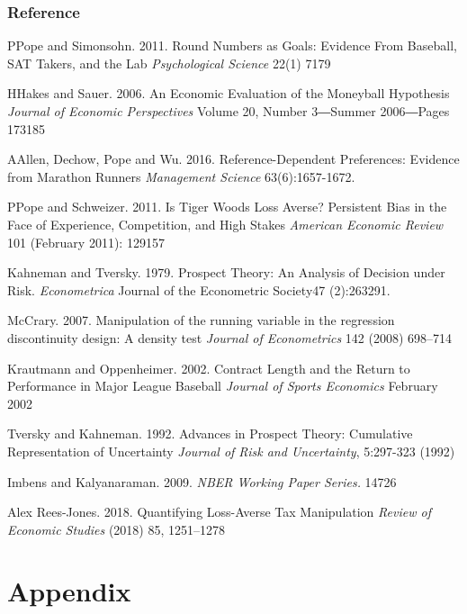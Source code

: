 \documentclass[dvipdfmx,12pt]{beamer}
\begin{document}
\begin{frame}\frametitle{Reference}
  \tiny
  \begin{thebibliography}{99}
    \bibitem PPope and Simonsohn. 2011.
    Round Numbers as Goals: Evidence From Baseball, SAT Takers, and the Lab
    \textit{Psychological Science} 22(1) 7179

    \bibitem HHakes and Sauer. 2006.
    An Economic Evaluation of the Moneyball Hypothesis
    \textit{Journal of Economic Perspectives} Volume 20, Number 3―Summer 2006―Pages 173185

    \bibitem AAllen, Dechow, Pope and Wu. 2016.
    Reference-Dependent Preferences: Evidence from Marathon Runners \textit{Management Science} 63(6):1657-1672.

    \bibitem PPope and Schweizer. 2011.
    Is Tiger Woods Loss Averse? Persistent Bias in the Face of Experience, Competition, and High Stakes
    \textit{American Economic Review} 101 (February 2011): 129157

    \bibitem{}Kahneman and Tversky. 1979.
    Prospect Theory: An Analysis of Decision under Risk.
    \textit{Econometrica}
    Journal of the Econometric Society47 (2):263291.

    \bibitem{}McCrary. 2007.
    Manipulation of the running variable in the regression discontinuity design: A density test
    \textit{Journal of Econometrics} 142 (2008) 698–714

    \bibitem{}Krautmann and Oppenheimer. 2002.
    Contract Length and the Return to Performance in Major League Baseball
    \textit{Journal of Sports Economics} February 2002

    \bibitem{}Tversky and Kahneman. 1992.
    Advances in Prospect Theory: Cumulative Representation of Uncertainty
    \textit{Journal of Risk and Uncertainty}, 5:297-323 (1992)

    \bibitem{}Imbens and Kalyanaraman. 2009.
    \textit{NBER Working Paper Series.} 14726

    \bibitem{}Alex Rees-Jones. 2018.
    Quantifying Loss-Averse Tax Manipulation
    \textit{Review of Economic Studies} (2018) 85, 1251–1278
  \end{thebibliography}

\end{frame}

\section*{Appendix}
\begin{frame}

\end{frame}
\end{document}
